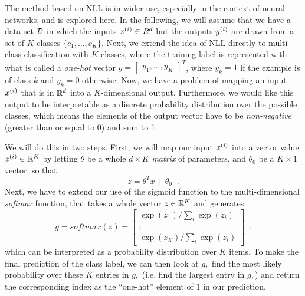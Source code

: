   The method based on NLL is in wider use, especially in the context of
  neural networks, and is explored here.
  In the following, we will assume that we have a data set ${\cal D}$ in
  which the inputs
$x^{(i)} \in R^d$ but the outputs $y^{(i)}$ are drawn from a set
  of $K$ classes $\{c_1, \ldots, c_K\}$.
  Next, we extend the idea of NLL directly to multi-class
  classification with $K$ classes, where the training label is
  represented with what is called a {\em one-hot} vector
$y=\begin{bmatrix} y_1, \ldots, y_K \end{bmatrix}^T$, where $y_k=1$ if
  the example is of class $k$ and $y_k = 0$ otherwise.
  Now, we have a problem of mapping an input $x^{(i)}$ that is in
$\mathbb{R}^d$ into a $K$-dimensional output.  Furthermore, we would like this
  output to be interpretable as a discrete probability distribution over
  the possible classes, which means the elements of the output vector have to
  be {\em non-negative} (greater than or equal to 0) and sum to 1.

  We will do this in two steps.  First, we will map our input
$x^{(i)}$ into a vector value $z^{(i)} \in \mathbb{R}^K$ by letting $\theta$ be a
  whole $d \times K$ {\em matrix} of parameters, and $\theta_0$ be a $K
\times 1$ vector, so that
  \[z = \theta^T x + \theta_0\;\;.\]
  Next, we have to extend our use of the sigmoid function to the
  multi-dimensional {\em softmax} function, that takes
  a whole vector $z \in \mathbb{R}^K$ and generates
  \[g = \textit{softmax}(z) =
    \begin{bmatrix}
      \exp(z_1) / \sum_{i} \exp(z_i) \\
      \vdots                         \\
      \exp(z_K) / \sum_{i} \exp(z_i)
    \end{bmatrix}\;\;.\]
  which can be interpreted as a probability distribution over $K$ items. To make the final prediction of the class label, we can then look at $g,$ find the most likely probability over these $K$ entries in $g,$ (i.e. find the largest entry in $g,$) and return the corresponding index as the ``one-hot'' element of $1$ in our prediction.


